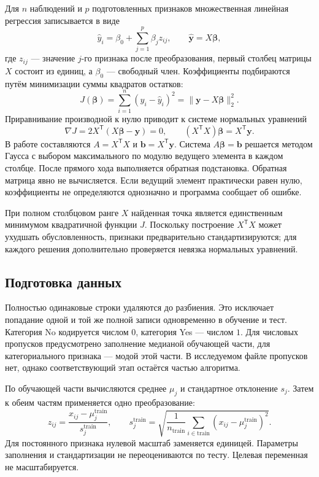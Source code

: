 Для $n$ наблюдений и $p$ подготовленных признаков множественная линейная
регрессия записывается в виде
\begin{equation}
\widehat y_i=\beta_0+\sum_{j=1}^{p}\beta_j z_{ij},
\qquad \widehat{\boldsymbol y}=X\boldsymbol\beta,
\end{equation}
где $z_{ij}$ --- значение $j$-го признака после преобразования, первый
столбец матрицы $X$ состоит из единиц, а $\beta_0$ --- свободный член.
Коэффициенты подбираются путём минимизации суммы квадратов остатков:
\begin{equation}
J(\boldsymbol\beta)=\sum_{i=1}^{n}(y_i-\widehat y_i)^2
=\|\boldsymbol y-X\boldsymbol\beta\|_2^2.
\end{equation}
Приравнивание производной к нулю приводит к системе нормальных уравнений
\begin{equation}
\nabla J=2X^{\mathsf T}(X\boldsymbol\beta-\boldsymbol y)=0,
\qquad
(X^{\mathsf T}X)\boldsymbol\beta=X^{\mathsf T}\boldsymbol y.
\end{equation}
В работе составляются $A=X^{\mathsf T}X$ и
$\boldsymbol b=X^{\mathsf T}\boldsymbol y$. Система
$A\boldsymbol\beta=\boldsymbol b$ решается методом Гаусса с выбором
максимального по модулю ведущего элемента в каждом столбце. После прямого
хода выполняется обратная подстановка. Обратная матрица явно не вычисляется.
Если ведущий элемент практически равен нулю, коэффициенты не определяются
однозначно и программа сообщает об ошибке.

При полном столбцовом ранге $X$ найденная точка является единственным
минимумом квадратичной функции $J$. Поскольку построение $X^{\mathsf T}X$
может ухудшать обусловленность, признаки предварительно стандартизируются;
для каждого решения дополнительно проверяется невязка нормальных уравнений.

\subsection{Подготовка данных}

Полностью одинаковые строки удаляются до разбиения. Это исключает попадание
одной и той же полной записи одновременно в обучение и тест. Категория
No кодируется числом $0$, категория Yes --- числом $1$. Для числовых пропусков
предусмотрено заполнение медианой обучающей части, для категориального
признака --- модой этой части. В исследуемом файле пропусков нет, однако
соответствующий этап остаётся частью алгоритма.

По обучающей части вычисляются среднее $\mu_j$ и стандартное отклонение
$s_j$. Затем к обеим частям применяется одно преобразование:
\begin{equation}
z_{ij}=\frac{x_{ij}-\mu_j^{\mathrm{train}}}
{s_j^{\mathrm{train}}},
\qquad
s_j^{\mathrm{train}}=
\sqrt{\frac{1}{n_{\mathrm{train}}}
\sum_{i\in\mathrm{train}}(x_{ij}-\mu_j^{\mathrm{train}})^2}.
\end{equation}
Для постоянного признака нулевой масштаб заменяется единицей. Параметры
заполнения и стандартизации не переоцениваются по тесту. Целевая переменная
не масштабируется.

